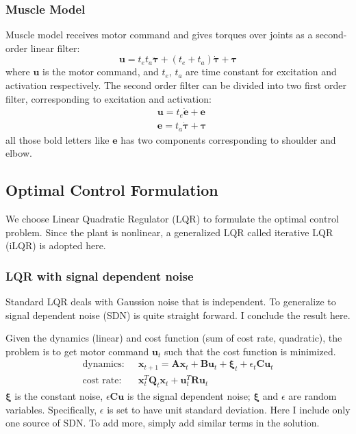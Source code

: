 \subsubsection{Muscle Model}
Muscle model receives motor command and gives torques over joints as a second-order linear filter:
\begin{equation}
	\bm{u} = t_et_a\ddot{\bm{\tau}} + (t_e+t_a)\dot{\bm{\tau}} +\bm{\tau}
\end{equation}
where $\bm{u}$ is the motor command, and $t_e$, $t_a$ are time constant for excitation and activation respectively. The second order filter can be divided into two first order filter, corresponding to excitation and activation:
\begin{equation}
	\begin{split}
	& \bm{u} = t_e \dot{\bm{e}} + \bm{e} \\
	& \bm{e} = t_a \dot{\bm{\tau}} + \bm{\tau}
	\end{split}
\end{equation}
all those bold letters like $\bm{e}$ has two components corresponding to shoulder and elbow.

\subsection{Optimal Control Formulation}\label{ocformulation}
We choose Linear Quadratic Regulator (LQR) \cite{todorov2006optimal} to formulate the optimal control problem. Since the plant is nonlinear, a generalized LQR called iterative LQR (iLQR) is adopted here.

\subsubsection{LQR with signal dependent noise}
Standard LQR deals with Gaussion noise that is independent. To generalize to signal dependent noise (SDN) is quite straight forward. I conclude the result here.

Given the dynamics (linear) and cost function (sum of cost rate, quadratic), the problem is to get motor command $\bm{u}_t$ such that the cost function is minimized.
\begin{equation}\label{optimprob}
	\begin{split}
	\text{dynamics:~~} & \bm{x}_{t+1} = \bm{Ax}_t + \bm{Bu}_t + \bm{\xi}_t + \epsilon_t\bm{Cu}_t \\
	\text{cost rate:~~} & \bm{x}_t^T\bm{Q}_t\bm{x}_t + \bm{u}_t^T\bm{Ru}_t
	\end{split}
\end{equation}
$\bm{\xi}$ is the constant noise, $\epsilon\bm{Cu}$ is the signal dependent noise; $\bm{\xi}$ and $\epsilon$ are random variables. Specifically, $\epsilon$ is set to have unit standard deviation. Here I include only one source of SDN. To add more, simply add similar terms in the solution.

